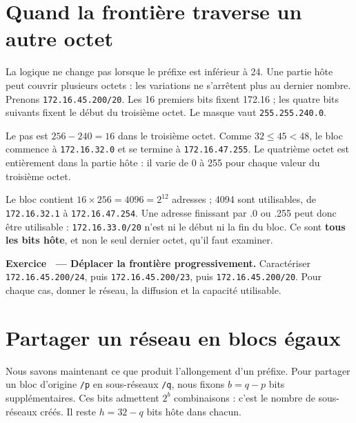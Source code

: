 \documentclass[11pt,a4paper]{article}
\newif\ifcorrige
\newcommand{\ip}[1]{\textcolor{ipred}{\texttt{#1}}}
\newcounter{exo}
\newcommand{\exo}[2]{%
  \Needspace{6cm}\stepcounter{exo}\begin{quest}\textbf{Exercice \theexo\ — #1.} #2\end{quest}}
\newcommand{\zone}[2]{%
  \ifcorrige
    \begin{tcolorbox}[colback=corrbg,colframe=corr,boxrule=0.6pt,arc=1pt,left=5pt,right=5pt,
      fontupper=\small\color{corr}]#2\end{tcolorbox}%
  \else
    \begin{tcolorbox}[colback=white,colframe=black!45,boxrule=0.5pt,arc=1pt,height=#1]\end{tcolorbox}%
  \fi}
\begin{document}
\Needspace{6cm}
\section{Quand la frontière traverse un autre octet}
La logique ne change pas lorsque le préfixe est inférieur à 24. Une partie hôte peut couvrir
plusieurs octets : les variations ne s'arrêtent plus au dernier nombre.
Prenons \ip{172.16.45.200/20}. Les 16 premiers bits fixent 172.16 ; les quatre bits suivants
fixent le début du troisième octet. Le masque vaut \ip{255.255.240.0}.

Le pas est $256-240=16$ dans le troisième octet. Comme $32\leq45<48$, le bloc commence à
\ip{172.16.32.0} et se termine à \ip{172.16.47.255}.
Le quatrième octet est entièrement dans la partie hôte : il varie de 0 à 255 pour chaque valeur
du troisième octet.
\begin{center}
\end{center}
Le bloc contient $16\times256=4096=2^{12}$ adresses ; 4094 sont utilisables,
de \ip{172.16.32.1} à \ip{172.16.47.254}.
Une adresse finissant par .0 ou .255 peut donc être utilisable :
\ip{172.16.33.0/20} n'est ni le début ni la fin du bloc.
Ce sont \textbf{tous les bits hôte}, et non le seul dernier octet, qu'il faut examiner.

\exo{Déplacer la frontière progressivement}{Caractériser \ip{172.16.45.200/24},
puis \ip{172.16.45.200/23}, puis \ip{172.16.45.200/20}.
Pour chaque cas, donner le réseau, la diffusion et la capacité utilisable.}
\zone{2.6cm}{/24 : réseau \ip{172.16.45.0}, diffusion \ip{172.16.45.255}, 254 utilisables.
/23 : masque \ip{255.255.254.0}, pas 2 au troisième octet ; réseau \ip{172.16.44.0},
diffusion \ip{172.16.45.255}, 510 utilisables.
/20 : réseau \ip{172.16.32.0}, diffusion \ip{172.16.47.255}, 4094 utilisables.}

\Needspace{6cm}
\section{Partager un réseau en blocs égaux}
Nous savons maintenant ce que produit l'allongement d'un préfixe. Pour partager un bloc d'origine
\ip{/p} en sous-réseaux \ip{/q}, nous fixons $b=q-p$ bits supplémentaires.
Ces bits admettent $2^b$ combinaisons : c'est le nombre de sous-réseaux créés.
Il reste $h=32-q$ bits hôte dans chacun.
\end{document}

